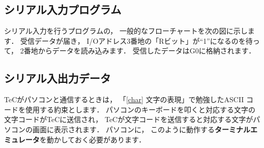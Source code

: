 \subsection{シリアル入力プログラム}
シリアル入力を行うプログラムの，
一般的なフローチャートを次の図に示します．
受信データが届き，
I/Oアドレス3番地の「Rビット」が``1''になるのを待って，
2番地からデータを読み込みます．
受信したデータはG0に格納されます．

\begin{center}
\end{center}

\subsection{シリアル入出力データ}
TeCがパソコンと通信するときは，
「\ref{char} 文字の表現」で勉強したASCII コードを使用する約束とします．
パソコンのキーボードを叩くと対応する文字の文字コードがTeCに送信され，
TeCが文字コードを送信すると対応する文字がパソコンの画面に表示されます．
パソコンに，
このように動作する{\bf ターミナルエミュレータ}を動かしておく必要があります．

%
%

